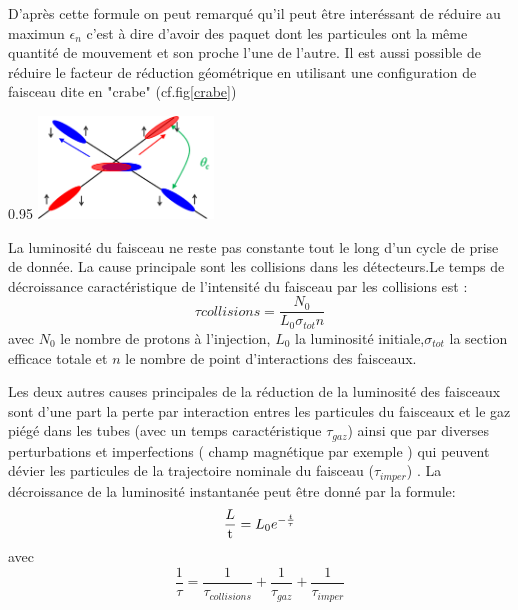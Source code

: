 D'après cette formule on peut remarqué qu'il peut être interéssant de réduire au maximun $\epsilon_{n}$ c'est à dire d'avoir des paquet dont les particules ont la même quantité de mouvement et son proche l'une de l'autre. Il est aussi possible de réduire le facteur de réduction géométrique en utilisant une configuration de faisceau dite en "crabe" (cf.fig\ref{crabe})

\begin{minipagewithmarginpars}[h]{0.95\textwidth}
\centering
\includegraphics[width=0.35\textwidth]{LHC/crab.png}
\label{crabe}	
\end{minipagewithmarginpars}

La luminosité du faisceau ne reste pas constante tout le long d'un cycle de prise de donnée. La cause principale sont les collisions dans les détecteurs.Le temps de décroissance caractéristique de l'intensité du faisceau par les collisions est :
\begin{equation}
\tau{collisions}=\frac{N_{0}}{L_{0}\sigma_{tot}n}
\end{equation}
avec $N_{0}$ le nombre de protons à l'injection, $L_{0}$ la luminosité initiale,$\sigma_{tot}$ la section efficace totale et $n$ le nombre de point d'interactions des faisceaux.

Les deux autres causes principales de la réduction de la luminosité des faisceaux sont d'une part la perte par interaction entres les particules du faisceaux et le gaz piégé dans les tubes (avec un temps caractéristique $\tau_{gaz}$) ainsi que par diverses perturbations et imperfections ( champ magnétique par exemple ) qui peuvent dévier les particules de la trajectoire nominale du faisceau ($\tau_{imper}$) . 
La décroissance de la luminosité instantanée peut être donné par la formule:
\begin{equation}
\frac{\mathrm \mathcal{L}}{\mathrm t} = L_{0} e^{-\frac{t}{\tau}}
\end{equation}
avec
\begin{equation}
\frac{1}{\tau} = \frac{1}{\tau_{collisions}}+\frac{1}{\tau_{gaz}}+\frac{1}{\tau_{imper}}
\end{equation}

